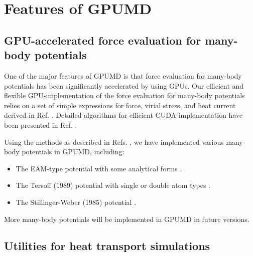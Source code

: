 \documentclass[12pt,a4paper]{report}
\begin{document}
\chapter{Features of GPUMD}


\section{GPU-accelerated force evaluation for many-body potentials}

One of the major features of GPUMD is that force evaluation for many-body potentials has been significantly accelerated by using GPUs. Our efficient and flexible GPU-implementation of the force evaluation for many-body potentials relies on a set of simple expressions for force, virial stress, and heat current derived in Ref. \cite{fan2015prb}. Detailed algorithms for efficient CUDA-implementation have been presented in Ref. \cite{fan2017cpc}.

Using the methods as described in Refs. \cite{fan2015prb,fan2017cpc}, we have implemented various many-body potentials in GPUMD, including:
\begin{itemize}
\item The EAM-type potential with some analytical forms \cite{zhou2004prb,dai2006jpcm}.
\item The Tersoff (1989) potential with single or double atom types \cite{tersoff1989prb}.
\item The Stillinger-Weber (1985) potential \cite{stillinger1985prb}.
\end{itemize}
More many-body potentials will be implemented in GPUMD in future versions.

\section{Utilities for heat transport simulations}
\end{document}
